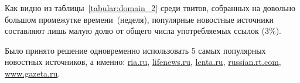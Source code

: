        Как видно из таблицы~\ref{tabular:domain_2} среди твитов, собранных на довольно большом промежутке времени~(неделя), популярные новостные источники
        составляют лишь малую долю от общего числа употребляемых ссылок (3\%).

        Было принято решение одновременно использовать 5 самых популярных новостных источников, а именно: \url{ria.ru},
        \url{lifenews.ru}, \url{lenta.ru}, \url{russian.rt.com}, \url{www.gazeta.ru}.


        \clearpage
%
%
%
%
%
%



